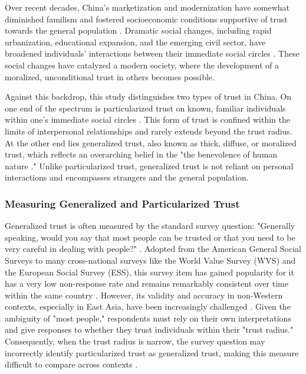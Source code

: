 Over recent decades, China's marketization and modernization have somewhat diminished familism and fostered socioeconomic conditions supportive of trust towards the general population \parencite{xuChangesMainlandChinese2014,yanChineseFamiliesUpside2021}. Dramatic social changes, including rapid urbanization, educational expansion, and the emerging civil sector, have broadened individuals' interactions between their immediate social circles \parencite{bianOccupationClassSocial2005,steinhardtSocioEconomicModernizationCrisis2020}. These social changes have catalyzed a modern society, where the development of a moralized, unconditional trust in others becomes possible.

Against this backdrop, this study distinguishes two types of trust in China. On one end of the spectrum is particularized trust on known, familiar individuals within one's immediate social circles \parencite{delheyHowGeneralTrust2011,kramerIngroupOutgroupTrust2017,steinhardtSocioEconomicModernizationCrisis2020}. This form of trust is confined within the limits of interpersonal relationships and rarely extends beyond the trust radius. At the other end lies generalized trust, also known as thick, diffuse, or moralized trust, which reflects an overarching belief in the "the benevolence of human nature \parencite[p.~139]{yamagishiTrustCommitmentUnited1994}." Unlike particularized trust, generalized trust is not reliant on personal interactions and encompasses strangers and the general population.

\subsubsection{Measuring Generalized and Particularized Trust}

Generalized trust is often measured by the standard survey question: "Generally speaking, would you say that most people can be trusted or that you need to be very careful in dealing with people?" \parencite{rosenbergMisanthropyPoliticalIdeology1956}. Adopted from the American General Social Surveys to many cross-national surveys like the World Value Survey (WVS) and the European Social Survey (ESS), this survey item has gained popularity for it has a very low non-response rate and remains remarkably consistent over time within the same country \parencite{nannestadWhatHaveWe2008}. However, its validity and accuracy in non-Western contexts, especially in East Asia, have been increasingly challenged \parencite{delheyPredictingCrossNationalLevels2005,glaeserMeasuringTrust2000,torpeIdentifyingSocialTrust2011}. Given the ambiguity of "most people," respondents must rely on their own interpretations and give responses to whether they trust individuals within their "trust radius." Consequently, when the trust radius is narrow, the survey question may incorrectly identify particularized trust as generalized trust, making this measure difficult to compare across contexts \parencite{delheyHowGeneralTrust2011,delheyPredictingCrossNationalLevels2005,torpeIdentifyingSocialTrust2011}.

